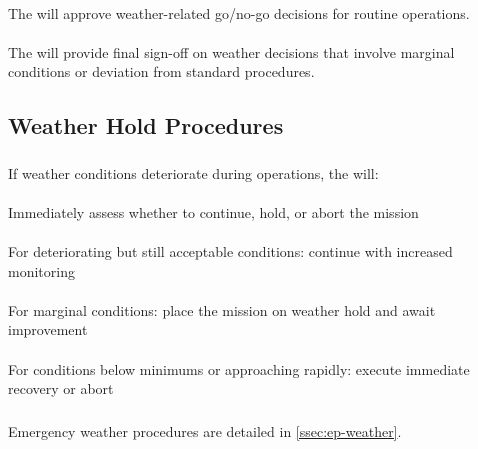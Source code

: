            \paragraph{} The  will approve weather-related go/no-go decisions for routine operations.

            \paragraph{} The  will provide final sign-off on weather decisions that involve marginal conditions or deviation from standard procedures.

    \subsection{Weather Hold Procedures}\label{ssec:weatherhold}

        \subsubsection{} If weather conditions deteriorate during operations, the  will:

        \paragraph{} Immediately assess whether to continue, hold, or abort the mission
        \paragraph{} For deteriorating but still acceptable conditions: continue with increased monitoring
        \paragraph{} For marginal conditions: place the mission on weather hold and await improvement
        \paragraph{} For conditions below minimums or approaching rapidly: execute immediate recovery or abort

        \subsubsection{} Emergency weather procedures are detailed in \cref{ssec:ep-weather}.

